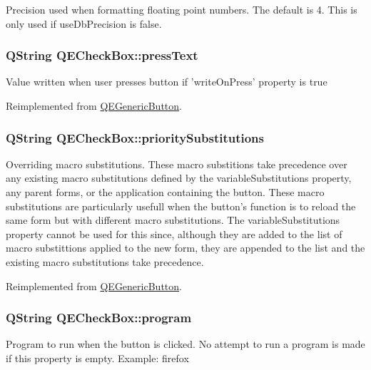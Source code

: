\label{classQECheckBox_a24743b70dcbdbe44c90124d366b15821}
Precision used when formatting floating point numbers. The default is 4. This is only used if useDbPrecision is false. \hypertarget{classQECheckBox_a2e9e454ca0bed2cb95d8069ce054c492}{
\subsubsection[{pressText}]{\setlength{\rightskip}{0pt plus 5cm}QString QECheckBox::pressText}}
\label{classQECheckBox_a2e9e454ca0bed2cb95d8069ce054c492}
Value written when user presses button if 'writeOnPress' property is true 

Reimplemented from \hyperlink{classQEGenericButton}{QEGenericButton}.

\hypertarget{classQECheckBox_abbb40c6cf9c0e13687d7a69746cc9a9e}{
\subsubsection[{prioritySubstitutions}]{\setlength{\rightskip}{0pt plus 5cm}QString QECheckBox::prioritySubstitutions}}
\label{classQECheckBox_abbb40c6cf9c0e13687d7a69746cc9a9e}
Overriding macro substitutions. These macro substitions take precedence over any existing macro substitutions defined by the variableSubstitutions property, any parent forms, or the application containing the button. These macro substitutions are particularly usefull when the button's function is to reload the same form but with different macro substitutions. The variableSubstitutions property cannot be used for this since, although they are added to the list of macro substittions applied to the new form, they are appended to the list and the existing macro substitutions take precedence. 

Reimplemented from \hyperlink{classQEGenericButton}{QEGenericButton}.

\hypertarget{classQECheckBox_a96cfc66f8de0a3ecb1e7898756261e26}{
\subsubsection[{program}]{\setlength{\rightskip}{0pt plus 5cm}QString QECheckBox::program}}
\label{classQECheckBox_a96cfc66f8de0a3ecb1e7898756261e26}
Program to run when the button is clicked. No attempt to run a program is made if this property is empty. Example: firefox 

